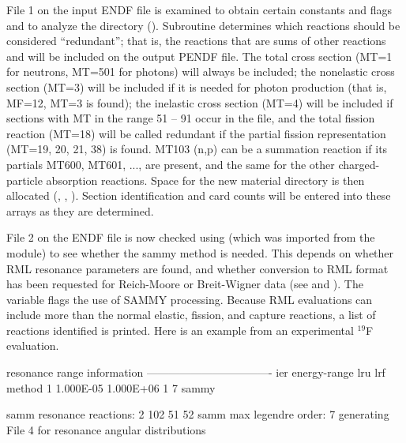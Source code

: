 File 1 on the input ENDF file is examined to obtain certain
constants and flags and to analyze the directory
().
Subroutine  determines which reactions should be
considered ``redundant''; that is, the reactions that are sums of
other reactions and will be included on the output PENDF file.
The total cross section (MT=1 for neutrons, MT=501 for photons)
will always be included; the nonelastic cross section (MT=3) will
be included if it is needed for photon production (that is,
MF=12, MT=3 is found); the inelastic cross section (MT=4) will be
included if sections with MT in the range 51 -- 91 occur in the
file, and the total fission reaction (MT=18) will be called
redundant if the partial fission representation (MT=19, 20, 21,
38) is found.  MT103 (n,p) can be a summation reaction if its
partials MT600, MT601, ..., are present, and the same for the other
charged-particle absorption reactions.  Space for the new
material directory is then allocated (, ,
).  Section identification and card counts will be
entered into these arrays as they are determined.

File 2 on the ENDF file is now checked using
(which was imported from the 
module) to see
whether the sammy method is needed.  This depends on whether
RML resonance parameters are found,
and whether conversion to RML format has been requested for
Reich-Moore or Breit-Wigner data (see
and ).
The variable  flags the use of SAMMY processing.
Because RML evaluations can include more than the normal elastic,
fission, and capture reactions, a list of reactions identified
is printed.  Here is an example from an experimental $^{19}$F evaluation.

\small
\begin{ccode}

 resonance range information
 ----------------------------------
 ier     energy-range     lru lrf  method
  1  1.000E-05 1.000E+06   1   7   sammy

   samm resonance reactions:    2  102   51   52
   samm max legendre order:  7
   generating File 4 for resonance angular distributions

\end{ccode}
\normalsize

